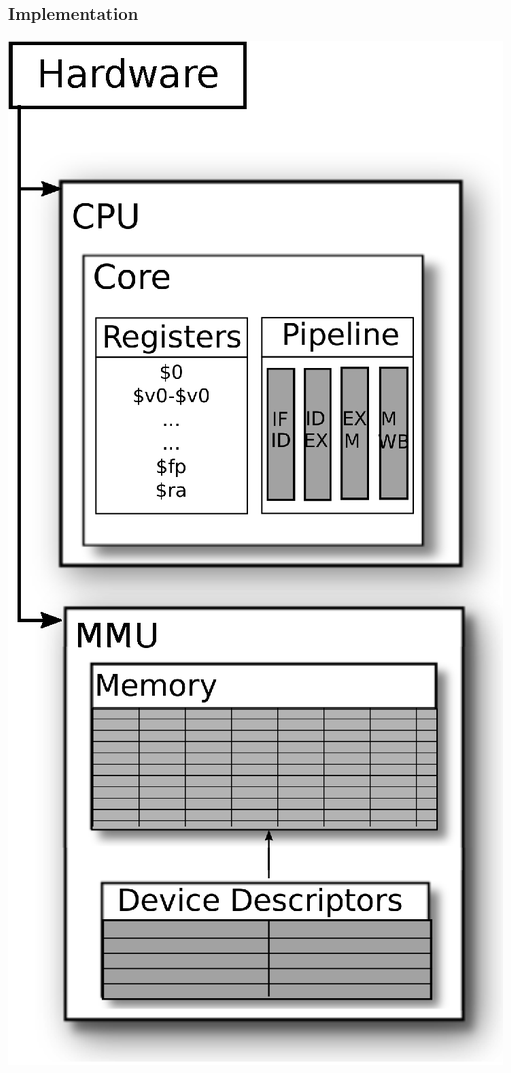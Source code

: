 \documentclass{beamer}
\begin{document}
\begin{frame}
	\frametitle{Implementation}
	\begin{center}
	\includegraphics[scale=0.35]{../pipeline/structure_layout.eps}
	\end{center}
\end{frame}
\end{document}
